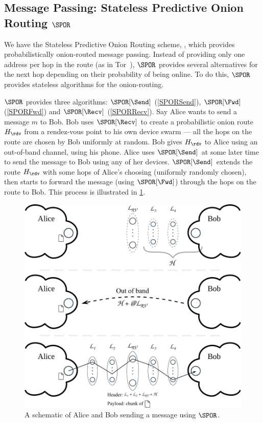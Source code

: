 
\subsection{Message Passing: Stateless Predictive Onion Routing \(\SPOR\)}


We have the Stateless Predictive Onion Routing scheme, \SPOR, which provides 
probabilistically onion-routed message passing.
Instead of providing only one address per hop in the route (as in \eg 
Tor~\cite{Tor}), \(\SPOR\) provides several alternatives for the next hop 
depending on their probability of being online.
To do this, \(\SPOR\) provides stateless algorithms for the onion-routing.

\(\SPOR\) provides three algorithms: \(\SPOR[\Send]\) (\cref{SPORSend}), 
\(\SPOR[\Fwd]\) (\cref{SPORFwd}) and \(\SPOR[\Recv]\) (\cref{SPORRecv}).
Say Alice wants to send a message \(m\) to Bob.
Bob uses \(\SPOR[\Recv]\) to create a probabilistic onion route \(H_\rdv\) from 
a rendez-vous point to his own device swarm --- all the hops on the route are 
chosen by Bob uniformly at random.
Bob gives \(H_\rdv\) to Alice using an out-of-band channel, \eg using his phone.
Alice uses \(\SPOR[\Send]\) at some later time to send the message to Bob using 
any of her devices.
\(\SPOR[\Send]\) extends the route \(H_\rdv\) with some hops of Alice's choosing 
(uniformly randomly chosen), then starts to forward the message (using 
\(\SPOR[\Fwd]\)) through the hops on the route to Bob.
This process is illustrated in \cref{fig:file-exchange}.

\begin{figure}
  \includegraphics[width=\linewidth]{figures/file_exchange.pdf}
  \caption{\label{fig:file-exchange}%
    A schematic of Alice and Bob sending a message using \(\SPOR\).
  }
\end{figure}


